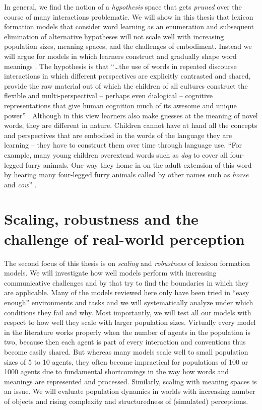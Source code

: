 \noindent In general, we find the notion of a \emph{hypothesis} space that gets
\emph{pruned} over the course of many interactions problematic. We
will show in this thesis that lexicon formation models that consider
word learning as an enumeration and subsequent elimination of
alternative hypotheses will not scale well with increasing population
sizes, meaning spaces, and the challenges of embodiment. Instead we
will argue for models in which learners construct and gradually shape
word meanings \citep{bowerman01shaping}. The hypothesis is that
``\dots the use of words in repeated discourse interactions in which
different perspectives are explicitly contrasted and shared, provide
the raw material out of which the children of all cultures construct
the flexible and multi-perspectival -- perhaps even dialogical --
cognitive representations that give human cognition much of its
awesome and unique power'' \citep[p. 163]{tomasello99cultural}.
Although in this view learners also make guesses at the meaning of
novel words, they are different in nature. Children cannot have at
hand all the concepts and perspectives that are embodied in the words
of the language they are learning -- they have to construct them over
time through language use. ``For example, many young children
overextend words such as \emph{dog} to cover all four-legged furry
animals. One way they home in on the adult extension of this word by
hearing many four-legged furry animals called by other names such as
\emph{horse} and \emph{cow}'' \citep[pp
73--74]{tomasello03constructing}.



\section{Scaling, robustness and the challenge of real-world
  perception}


The second focus of this thesis is on \emph{scaling} and
\emph{robustness} of lexicon formation models. We will investigate how
well models perform with increasing communicative challenges and by
that try to find the boundaries in which they are applicable. Many of
the models reviewed here only have been tried in ``easy enough''
environments and tasks and we will systematically analyze under which
conditions they fail and why. Most importantly, we will test all our
models with respect to how well they scale with larger population
sizes. Virtually every model in the literature works properly when the
number of agents in the population is two, because then each agent is
part of every interaction and conventions thus become easily
shared. But whereas many models scale well to small population sizes
of 5 to 10 agents, they often become impractical for populations of
100 or 1000 agents due to fundamental shortcomings in the way how
words and meanings are represented and processed. Similarly, scaling
with meaning spaces is an issue. We will evaluate population dynamics
in worlds with increasing number of objects and rising complexity and
structuredness of (simulated) perceptions.


